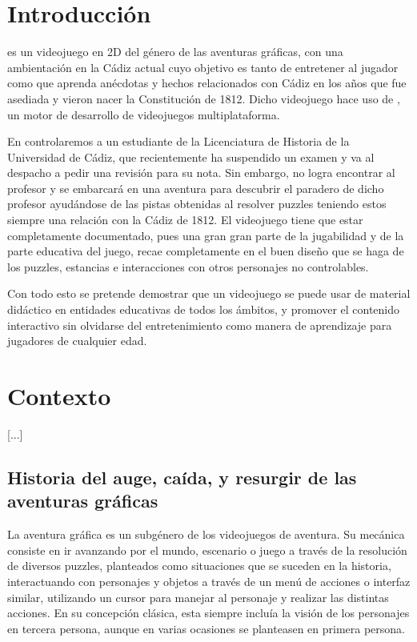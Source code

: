 



\section{Introducción}
\nombrejuego es un videojuego en 2D del género de las aventuras gráficas, con una ambientación en la Cádiz actual cuyo objetivo es tanto de entretener al jugador como que aprenda anécdotas y hechos relacionados con Cádiz en los años que fue asediada y vieron nacer la Constitución de 1812. Dicho videojuego hace uso de , un motor de desarrollo de videojuegos multiplataforma. 

En \nombrejuego controlaremos a un estudiante de la Licenciatura de Historia de la Universidad de Cádiz, que recientemente ha suspendido un examen y va al despacho a pedir una revisión para su nota. Sin embargo, no logra encontrar al profesor y se embarcará en una aventura para descubrir el paradero de dicho profesor ayudándose de las pistas obtenidas al resolver puzzles teniendo estos siempre una relación con la Cádiz de 1812. El videojuego tiene que estar completamente documentado, pues una gran gran parte de la jugabilidad y de la parte educativa del juego, recae completamente en el buen diseño que se haga de los puzzles, estancias e interacciones con otros personajes no controlables.

Con todo esto se pretende demostrar que un videojuego se puede usar de material didáctico en entidades educativas de todos los ámbitos, y promover el contenido interactivo sin olvidarse del entretenimiento como manera de aprendizaje para jugadores de cualquier edad.

\section{Contexto}
\label{sec:contexto}

[...]

\subsection{Historia del auge, caída, y resurgir de las aventuras gráficas}
\label{sec:ag}
La aventura gráfica es un subgénero de los videojuegos de aventura. Su mecánica consiste en ir avanzando por el mundo, escenario o juego a través de la resolución de diversos puzzles, planteados como situaciones que se suceden en la historia, interactuando con personajes y objetos a través de un menú de acciones o interfaz similar, utilizando un cursor para manejar al personaje y realizar las distintas acciones. En su concepción clásica, esta siempre incluía la visión de los personajes en tercera persona, aunque en varias ocasiones se planteasen en primera persona. 

